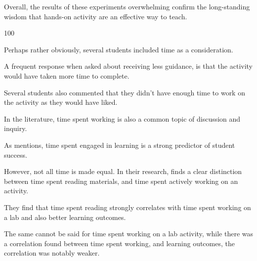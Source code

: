     Overall, the results of these experiments overwhelming confirm the long-standing wisdom that hands-on activity are an effective way to teach. %







 100\    







    Perhaps rather obviously, several students included time as a consideration. %







A frequent response when asked about receiving less guidance, is that the activity would have taken more time to complete. %







Several students also commented that they didn't have enough time to work on the activity as they would have liked. %







In the literature, time spent working is also a common topic of discussion and inquiry. %







As \textcite{C-Linehan} mentions, time spent engaged in learning is a strong predictor of student success. %







However, not all time is made equal. In their research, \textcite{Z-Zeng} finds a clear distinction between time spent reading materials, and time spent actively working on an activity. %







They find that time spent reading strongly correlates with time spent working on a lab and also better learning outcomes. %







The same cannot be said for time spent working on a lab activity, while there was a correlation found between time spent working, and learning outcomes, the correlation was notably weaker. 







